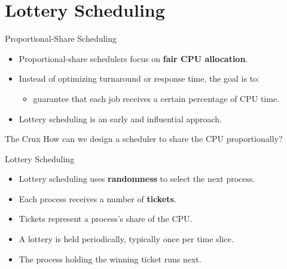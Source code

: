 \section{Lottery Scheduling}

\begin{frame}{Proportional-Share Scheduling}
    \begin{itemize}
        \item Proportional-share schedulers focus on \textbf{fair CPU allocation}.
        \item Instead of optimizing turnaround or response time, the goal is to:
        \begin{itemize}
            \item guarantee that each job receives a certain percentage of CPU time.
        \end{itemize}
        \item Lottery scheduling is an early and influential approach.
    \end{itemize}

    \begin{block}{The Crux}
        How can we design a scheduler to share the CPU proportionally?
    \end{block}
\end{frame}


\begin{frame}{Lottery Scheduling}
    \begin{itemize}
        \item Lottery scheduling uses \textbf{randomness} to select the next process.
        \item Each process receives a number of \textbf{tickets}.
        \item Tickets represent a process's share of the CPU.
        \item A lottery is held periodically, typically once per time slice.
        \item The process holding the winning ticket runs next.
    \end{itemize}
\end{frame}


